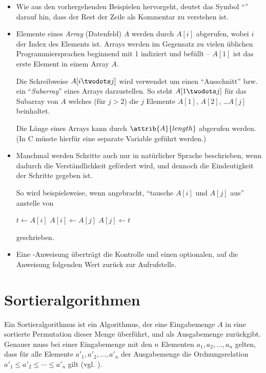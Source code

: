 \begin{itemize}
    \item Wie aus den vorhergehenden Beispielen hervorgeht, deutet das Symbol \enquote{\Comment} darauf hin, dass der Rest der Zeile als Kommentar zu verstehen ist.
    
    \item Elemente eines \emph{Array} (Datenfeld) $A$ werden durch $A[i]$ abgerufen, wobei $i$ der Index des Elements ist. Arrays werden im Gegensatz zu vielen üblichen Pro\-grammier\-sprachen beginnend mit 1 indiziert und befüllt -- $A[1]$ ist das erste Element in einem Array $A$.
    
    Die Schreibweise $A[i \twodots j]$ wird verwendet um einen \enquote{Ausschnitt} bzw. ein \enquote{\emph{Subarray}} eines Arrays darzustellen. So steht $A[1 \twodots j]$ für das Subarray von $A$ welches (für $j > 2$) die $j$ Elemente $A[1]$, $A[2]$, \ldots $A[j]$ beinhaltet.
    
    Die Länge eines Arrays kann durch $\attrib{A}{length}$ abgerufen werden. (In C müsste hierfür eine separate Variable geführt werden.)

    \item Manchmal werden Schritte auch nur in natürlicher Sprache beschrieben, wenn dadurch die Verständlichkeit gefördert wird, und dennoch die Eindeutigkeit der Schritte gegeben ist.

    So wird beispielsweise, wenn angebracht, \enquote{tausche $A[i]$ und $A[j]$ aus} anstelle von
    \begin{codebox}
        \li $t \gets A[i]$
        \li $A[i] \gets A[j]$
        \li $A[j] \gets t$
    \end{codebox}
    geschrieben.
    
    \item Eine \Return-Anweisung überträgt die Kontrolle und einen optionalen, auf die Anweisung folgenden Wert zurück zur Aufrufstelle.

\end{itemize}

\section{Sortieralgorithmen}
\label{sec:sorting-algorithms-definition}

Ein Sortieralgorithmus ist ein Algorithmus, der eine Eingabemenge $A$ in eine sortierte Permutation dieser Menge überführt, und als Ausgabemenge zurückgibt. Genauer muss bei einer Eingabemenge mit den $n$ Elementen $a_1, a_2, \ldots, a_n$ gelten, dass für alle Elemente $a'_1, a'_2, \ldots, a'_n$ der Ausgabemenge die Ordnungsrelation $a'_1 \leq a'_2 \leq \cdots \leq a'_n$ gilt (vgl. \cite[4]{taocp3}).

